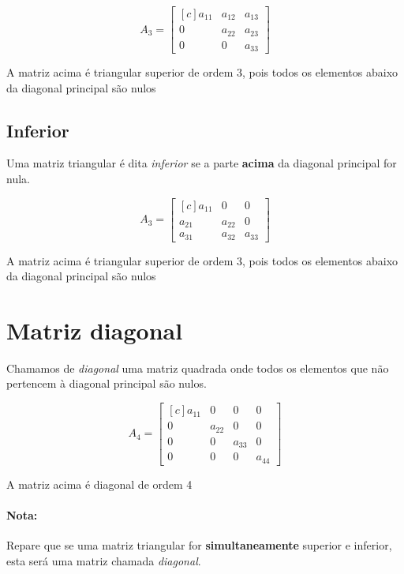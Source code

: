 $$
A_3=\begin{bmatrix*}[c]
a_{11} & a_{12} & a_{13}\\
0 & a_{22} & a_{23}\\
0 & 0 & a_{33}
\end{bmatrix*}
$$

\begin{center}
    \footnotesize{A matriz acima é triangular superior de ordem 3, pois todos os elementos abaixo da diagonal principal são nulos}
\end{center}

\subsection{Inferior}
Uma matriz triangular é dita \textit{inferior} se a parte \textbf{acima} da diagonal principal for nula.


$$
A_3=\begin{bmatrix*}[c]
a_{11} & 0 & 0\\
a_{21} & a_{22} & 0\\
a_{31} & a_{32} & a_{33}
\end{bmatrix*}
$$

\begin{center}
    \footnotesize{A matriz acima é triangular superior de ordem 3, pois todos os elementos abaixo da diagonal principal são nulos}
\end{center}

\section{Matriz diagonal}
Chamamos de \textit{diagonal} uma matriz quadrada onde todos os elementos que não pertencem à diagonal principal são nulos.

$$
A_4=\begin{bmatrix*}[c]
a_{11} & 0 & 0 & 0\\
0 & a_{22} & 0 & 0\\
0 & 0 & a_{33} & 0\\
0 & 0 & 0 & a_{44}
\end{bmatrix*}
$$

\begin{center}
    \footnotesize{A matriz acima é diagonal de ordem 4}
\end{center}

\paragraph{Nota:}
Repare que se uma matriz triangular for \textbf{simultaneamente} superior e inferior, esta será uma matriz chamada \textit{diagonal}.

